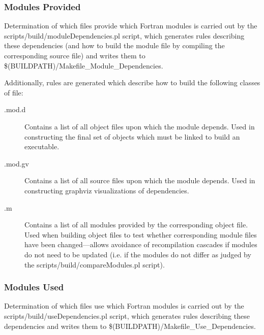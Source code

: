 \subsubsection{Modules Provided}\label{sec:buildModulesProvided}

Determination of which files provide which Fortran modules is carried out by the {\normalfont \ttfamily scripts/build/moduleDependencies.pl} script, which generates rules describing these dependencies (and how to build the module file by compiling the corresponding source file) and writes them to {\normalfont \ttfamily \$(BUILDPATH)/Makefile\_Module\_Dependencies}.

Additionally, rules are generated which describe how to build the following classes of file:
\begin{description}
\item[{\normalfont \ttfamily *.mod.d}] Contains a list of all object files upon which the module depends. Used in constructing the final set of objects which must be linked to build an executable.
\item[{\normalfont \ttfamily *.mod.gv}] Contains a list of all source files upon which the module depends. Used in constructing \gls{graphviz} visualizations of dependencies.
\item[{\normalfont \ttfamily *.m}] Contains a list of all modules provided by the corresponding object file. Used when building object files to test whether corresponding module files have been changed---allows avoidance of recompilation cascades if modules do not need to be updated (i.e. if the modules do not differ as judged by the {\normalfont \ttfamily scripts/build/compareModules.pl} script).
\end{description}

\subsubsection{Modules Used}\label{sec:buildModulesUsed}

Determination of which files use which Fortran modules is carried out by the {\normalfont \ttfamily scripts/build/useDependencies.pl} script, which generates rules describing these dependencies and writes them to {\normalfont \ttfamily \$(BUILDPATH)/Makefile\_Use\_Dependencies}.


